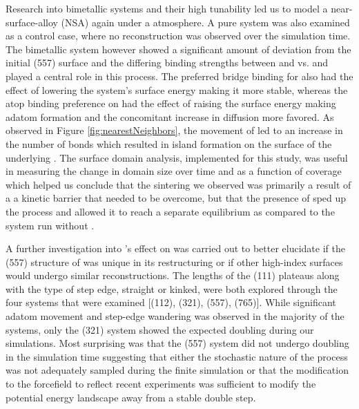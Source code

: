 Research into bimetallic systems and their high tunability led us to model a
 near-surface-alloy (NSA) again under a  atmosphere. A
pure  system was also examined as a control case, where no
reconstruction was observed over the simulation time. The bimetallic system
however showed a significant amount of deviation from the initial (557) surface
and the differing binding strengths between  and  vs.  and
 played a central role in this process. The preferred bridge binding for
 also had the effect of lowering the  system's surface energy making it
more stable, whereas the atop binding preference on  had the effect of
raising the surface energy making adatom formation and the concomitant increase
in diffusion more favored. As observed in Figure \ref{fig:nearestNeighbors},
the movement of  led to an increase in the number of
 bonds which resulted in island formation on the surface of
the underlying . The surface domain analysis, implemented for this
study, was useful in measuring the change in domain size over time and as a
function of  coverage which helped us conclude that the sintering we
observed was primarily a result of a a kinetic barrier that needed to be
overcome, but that the presence of  sped up the process and allowed it
to reach a separate equilibrium as compared to the system run without .

A further investigation into 's effect on  was carried out to
better elucidate if the (557) structure of  was unique in its
restructuring or if other high-index surfaces would undergo similar
reconstructions. The lengths of the (111) plateaus along with the type of step
edge, straight or kinked, were both explored through the four systems that were
examined [(112), (321), (557), (765)]. While significant adatom movement and
step-edge wandering was observed in the majority of the systems, only the (321)
system showed the expected doubling during our simulations. Most surprising
was that the (557) system did not undergo doubling in the simulation time
suggesting that either the stochastic nature of the process was not adequately
sampled during the finite simulation or that the modification to the
 forcefield to reflect recent
experiments\citep{Deshlahra:2012aa} was sufficient to modify the potential
energy landscape away from a stable double step.

